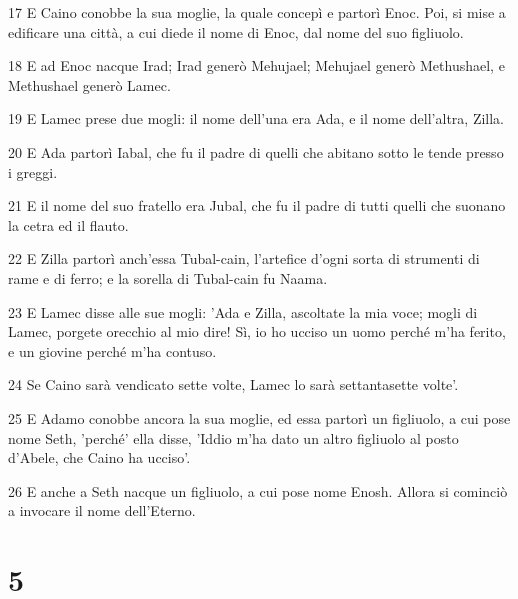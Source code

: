 \par 17 E Caino conobbe la sua moglie, la quale concepì e partorì Enoc. Poi, si mise a edificare una città, a cui diede il nome di Enoc, dal nome del suo figliuolo.
\par 18 E ad Enoc nacque Irad; Irad generò Mehujael; Mehujael generò Methushael, e Methushael generò Lamec.
\par 19 E Lamec prese due mogli: il nome dell'una era Ada, e il nome dell'altra, Zilla.
\par 20 E Ada partorì Iabal, che fu il padre di quelli che abitano sotto le tende presso i greggi.
\par 21 E il nome del suo fratello era Jubal, che fu il padre di tutti quelli che suonano la cetra ed il flauto.
\par 22 E Zilla partorì anch'essa Tubal-cain, l'artefice d'ogni sorta di strumenti di rame e di ferro; e la sorella di Tubal-cain fu Naama.
\par 23 E Lamec disse alle sue mogli: 'Ada e Zilla, ascoltate la mia voce; mogli di Lamec, porgete orecchio al mio dire! Sì, io ho ucciso un uomo perché m'ha ferito, e un giovine perché m'ha contuso.
\par 24 Se Caino sarà vendicato sette volte, Lamec lo sarà settantasette volte'.
\par 25 E Adamo conobbe ancora la sua moglie, ed essa partorì un figliuolo, a cui pose nome Seth, 'perché' ella disse, 'Iddio m'ha dato un altro figliuolo al posto d'Abele, che Caino ha ucciso'.
\par 26 E anche a Seth nacque un figliuolo, a cui pose nome Enosh. Allora si cominciò a invocare il nome dell'Eterno.

\chapter{5}

